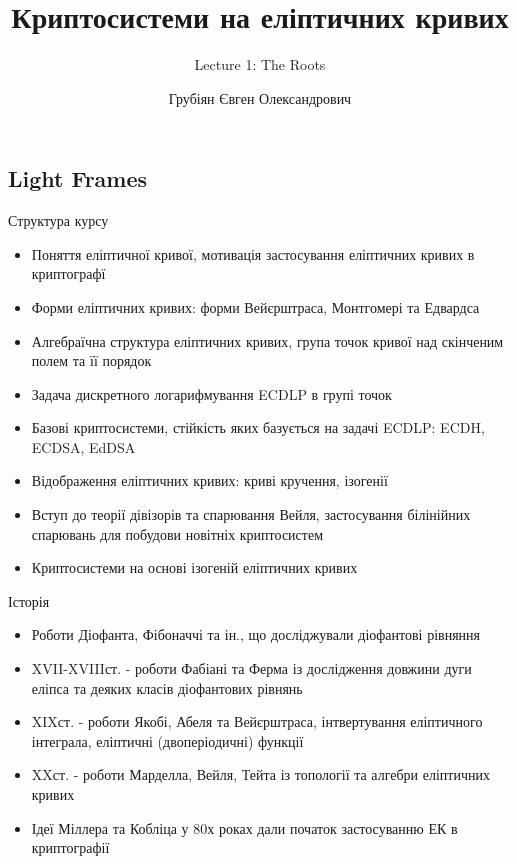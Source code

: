 \documentclass[10pt]{beamer}
\title{Криптосистеми на еліптичних кривих} %
\subtitle{Lecture 1: The Roots}
\author{Грубіян Євген Олександрович}
\begin{document}
  \frame{\maketitle}


  \begin{darkframes}
      
    \section{Light Frames}

\begin{frame}{Структура курсу}
  \begin{itemize}
    \item Поняття еліптичної кривої, мотивація застосування еліптичних кривих в криптографї
    \item Форми еліптичних кривих: форми Вейєрштраса, Монтгомері та Едвардса
    \item Алгебраїчна структура еліптичних кривих, група точок кривої над скінченим полем та її порядок
    \item Задача дискретного логарифмування ECDLP в групі точок
    \item Базові криптосистеми, стійкість яких базується на задачі ECDLP: ECDH, ECDSA, EdDSA
    \item Відображення еліптичних кривих: криві кручення, ізогенії
    \item Вступ до теорії дівізорів та спарювання Вейля, застосування білінійних спарювань для побудови новітніх криптосистем
    \item Криптосистеми на основі ізогеній еліптичних кривих
  \end{itemize}
\end{frame}

\begin{frame}{Історія}
  \begin{itemize}
    \item Роботи Діофанта, Фібоначчі та ін., що досліджували діофантові рівняння
    \item XVII-XVIIIст. - роботи Фабіані та Ферма із дослідження довжини дуги еліпса та деяких класів діофантових рівнянь
    \item XIXст. - роботи Якобі, Абеля та Вейєрштраса, інтвертування еліптичного інтеграла, еліптичні (двоперіодичні) функції
    \item XXст. - роботи Марделла, Вейля, Тейта із топології та алгебри еліптичних кривих
    \item Ідеї Міллера та Кобліца у 80х роках дали початок застосуванню ЕК в криптографії
  \end{itemize}
\end{frame}


\end{darkframes}
\end{document}

